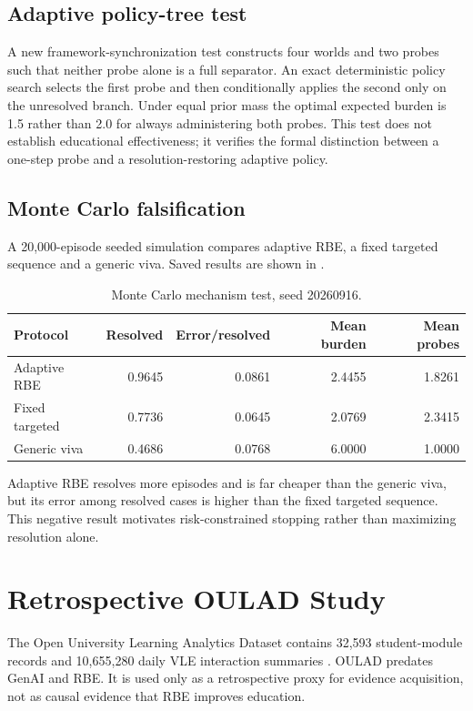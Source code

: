 \documentclass[11pt]{article}
\begin{document}
\subsection{Adaptive policy-tree test}
A new framework-synchronization test constructs four worlds and two probes such that neither probe alone is a full separator. An exact deterministic policy search selects the first probe and then conditionally applies the second only on the unresolved branch. Under equal prior mass the optimal expected burden is 1.5 rather than 2.0 for always administering both probes. This test does not establish educational effectiveness; it verifies the formal distinction between a one-step probe and a resolution-restoring adaptive policy.

\subsection{Monte Carlo falsification}
A 20,000-episode seeded simulation compares adaptive RBE, a fixed targeted sequence and a generic viva. Saved results are shown in .
\begin{table}[t]\centering\caption{Monte Carlo mechanism test, seed 20260916.}\label{tab:mc}
\begin{tabular}{lrrrr}\toprule Protocol&Resolved&Error/resolved&Mean burden&Mean probes\\\midrule
Adaptive RBE&0.9645&0.0861&2.4455&1.8261\\Fixed targeted&0.7736&0.0645&2.0769&2.3415\\Generic viva&0.4686&0.0768&6.0000&1.0000\\\bottomrule\end{tabular}\end{table}
Adaptive RBE resolves more episodes and is far cheaper than the generic viva, but its error among resolved cases is higher than the fixed targeted sequence. This negative result motivates risk-constrained stopping rather than maximizing resolution alone.

\section{Retrospective OULAD Study}
The Open University Learning Analytics Dataset contains 32,593 student-module records and 10,655,280 daily VLE interaction summaries \parencite{kuzilek2017oulad}. OULAD predates GenAI and RBE. It is used only as a retrospective proxy for evidence acquisition, not as causal evidence that RBE improves education.
\end{document}
